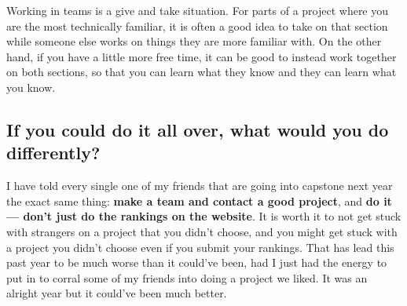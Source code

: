 \documentclass[onecolumn, draftclsnofoot,10pt, compsoc]{IEEEtran}
\begin{document}
Working in teams is a give and take situation. For parts of a project where you
are the most technically familiar, it is often a good idea to take on that section
while someone else works on things they are more familiar with. On the other hand,
if you have a little more free time, it can be good to instead work together on
both sections, so that you can learn what they know and they can learn what you
know.

\subsection{If you could do it all over, what would you do differently?}
I have told every single one of my friends that are going into capstone next year
the exact same thing: \textbf{make a team and contact a good project}, and
\textbf{do it --- don't just do the rankings on the website}. It is worth
it to not get stuck with strangers on a project that you didn't choose, and you
might get stuck with a project you didn't choose even if you submit your rankings.
That has lead this past year to be much worse than it could've been, had I just
had the energy to put in to corral some of my friends into doing a project we
liked. It was an alright year but it could've been much better.
\end{document}
